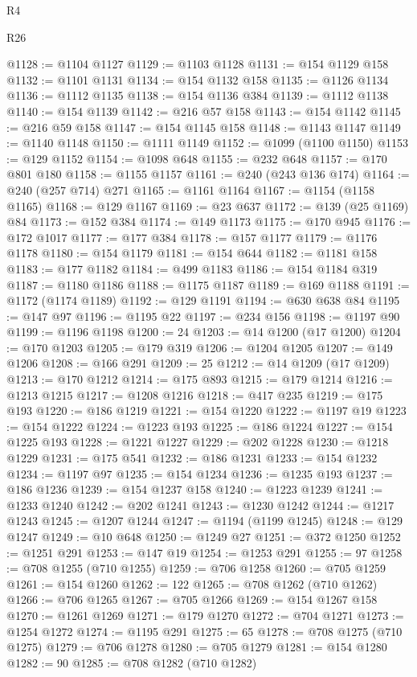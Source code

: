 \begin{lexlean}{R4}
\begin{lexlean}{R26}
\begin{coremodule}
{{{{{{{{{{{{{{{{{{{{{{{{{{{{{{{{{{{{{{{{{{{{{{{{{{{{{{{{{{{{{{{{{{{{{{{{@1128 := @1104 @1127
@1129 := @1103 @1128
@1131 := @154 @1129 @158
@1132 := @1101 @1131
@1134 := @154 @1132 @158
@1135 := @1126 @1134
@1136 := @1112 @1135
@1138 := @154 @1136 @384
@1139 := @1112 @1138
@1140 := @154 @1139
@1142 := @216 @57 @158
@1143 := @154 @1142
@1145 := @216 @59 @158
@1147 := @154 @1145 @158
@1148 := @1143 @1147
@1149 := @1140 @1148
@1150 := @1111 @1149
@1152 := @1099 (@1100 @1150)
@1153 := @129 @1152
@1154 := @1098 @648
@1155 := @232 @648
@1157 := @170 @801 @180
@1158 := @1155 @1157
@1161 := @240 (@243 @136 @174)
@1164 := @240 (@257 @714) @271
@1165 := @1161 @1164
@1167 := @1154 (@1158 @1165)
@1168 := @129 @1167
@1169 := @23 @637
@1172 := @139 (@25 @1169) @84
@1173 := @152 @384
@1174 := @149 @1173
@1175 := @170 @945
@1176 := @172 @1017
@1177 := @177 @384
@1178 := @157 @1177
@1179 := @1176 @1178
@1180 := @154 @1179
@1181 := @154 @644
@1182 := @1181 @158
@1183 := @177 @1182
@1184 := @499 @1183
@1186 := @154 @1184 @319
@1187 := @1180 @1186
@1188 := @1175 @1187
@1189 := @169 @1188
@1191 := @1172 (@1174 @1189)
@1192 := @129 @1191
@1194 := @630 @638 @84
@1195 := @147 @97
@1196 := @1195 @22
@1197 := @234 @156
@1198 := @1197 @90
@1199 := @1196 @1198
@1200 := 24
@1203 := @14 @1200 (@17 @1200)
@1204 := @170 @1203
@1205 := @179 @319
@1206 := @1204 @1205
@1207 := @149 @1206
@1208 := @166 @291
@1209 := 25
@1212 := @14 @1209 (@17 @1209)
@1213 := @170 @1212
@1214 := @175 @893
@1215 := @179 @1214
@1216 := @1213 @1215
@1217 := @1208 @1216
@1218 := @417 @235
@1219 := @175 @193
@1220 := @186 @1219
@1221 := @154 @1220
@1222 := @1197 @19
@1223 := @154 @1222
@1224 := @1223 @193
@1225 := @186 @1224
@1227 := @154 @1225 @193
@1228 := @1221 @1227
@1229 := @202 @1228
@1230 := @1218 @1229
@1231 := @175 @541
@1232 := @186 @1231
@1233 := @154 @1232
@1234 := @1197 @97
@1235 := @154 @1234
@1236 := @1235 @193
@1237 := @186 @1236
@1239 := @154 @1237 @158
@1240 := @1223 @1239
@1241 := @1233 @1240
@1242 := @202 @1241
@1243 := @1230 @1242
@1244 := @1217 @1243
@1245 := @1207 @1244
@1247 := @1194 (@1199 @1245)
@1248 := @129 @1247
@1249 := @10 @648
@1250 := @1249 @27
@1251 := @372 @1250
@1252 := @1251 @291
@1253 := @147 @19
@1254 := @1253 @291
@1255 := 97
@1258 := @708 @1255 (@710 @1255)
@1259 := @706 @1258
@1260 := @705 @1259
@1261 := @154 @1260
@1262 := 122
@1265 := @708 @1262 (@710 @1262)
@1266 := @706 @1265
@1267 := @705 @1266
@1269 := @154 @1267 @158
@1270 := @1261 @1269
@1271 := @179 @1270
@1272 := @704 @1271
@1273 := @1254 @1272
@1274 := @1195 @291
@1275 := 65
@1278 := @708 @1275 (@710 @1275)
@1279 := @706 @1278
@1280 := @705 @1279
@1281 := @154 @1280
@1282 := 90
@1285 := @708 @1282 (@710 @1282)
}}}}}}}}}}}}}}}}}}}}}}}}}}}}}}}}}}}}}}}}}}}}}}}}}}}}}}}}}}}}}}}}}}}}}}}}
\end{coremodule}
\end{lexlean}
\end{lexlean}
